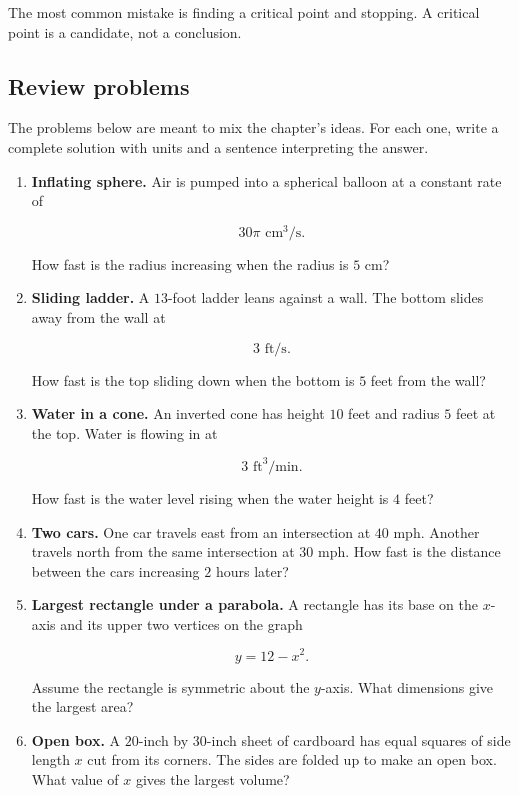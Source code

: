 The most common mistake is finding a critical point and stopping.  A critical point is
a candidate, not a conclusion.

\subsection{Review problems}
\label{subsec:chapter7-review-problems}

The problems below are meant to mix the chapter's ideas.  For each one, write a complete
solution with units and a sentence interpreting the answer.

\begin{enumerate}
\item \textbf{Inflating sphere.}
Air is pumped into a spherical balloon at a constant rate of

\[
30\pi\text{ cm}^3/\text{s}.
\]

How fast is the radius increasing when the radius is \(5\) cm?

\item \textbf{Sliding ladder.}
A \(13\)-foot ladder leans against a wall.  The bottom slides away from the wall at

\[
3\text{ ft/s}.
\]

How fast is the top sliding down when the bottom is \(5\) feet from the wall?

\item \textbf{Water in a cone.}
An inverted cone has height \(10\) feet and radius \(5\) feet at the top.  Water is
flowing in at

\[
3\text{ ft}^3/\text{min}.
\]

How fast is the water level rising when the water height is \(4\) feet?

\item \textbf{Two cars.}
One car travels east from an intersection at \(40\) mph.  Another travels north from
the same intersection at \(30\) mph.  How fast is the distance between the cars
increasing \(2\) hours later?

\item \textbf{Largest rectangle under a parabola.}
A rectangle has its base on the \(x\)-axis and its upper two vertices on the graph

\[
y=12-x^2.
\]

Assume the rectangle is symmetric about the \(y\)-axis.  What dimensions give the
largest area?

\item \textbf{Open box.}
A \(20\)-inch by \(30\)-inch sheet of cardboard has equal squares of side length \(x\)
cut from its corners.  The sides are folded up to make an open box.  What value of
\(x\) gives the largest volume?


\end{enumerate}
